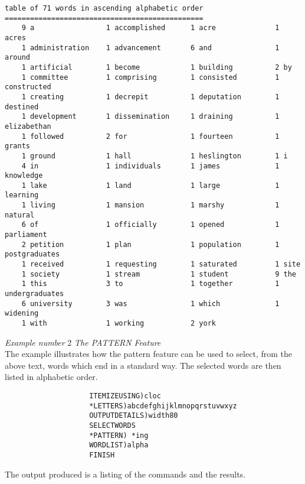 \begin{verbatim}
table of 71 words in ascending alphabetic order
===============================================
    9 a                 1 accomplished      1 acre              1 acres         
    1 administration    1 advancement       6 and               1 around        
    1 artificial        1 become            1 building          2 by            
    1 committee         1 comprising        1 consisted         1 constructed   
    1 creating          1 decrepit          1 deputation        1 destined      
    1 development       1 dissemination     1 draining          1 elizabethan
    1 followed          2 for               1 fourteen          1 grants
    1 ground            1 hall              1 heslington        1 i     
    4 in                1 individuals       1 james             1 knowledge
    1 lake              1 land              1 large             1 learning
    1 living            1 mansion           1 marshy            1 natural    
    6 of                1 officially        1 opened            1 parliament 
    2 petition          1 plan              1 population        1 postgraduates
    1 received          1 requesting        1 saturated         1 site
    1 society           1 stream            1 student           9 the
    1 this              3 to                1 together          1 undergraduates
    6 university        3 was               1 which             1 widening
    1 with              1 working           2 york          
\end{verbatim}

\newpage
 {\em Example number} 2                 {\em The PATTERN Feature}\\
 The example illustrates how the pattern feature can be used to select, from
 the above text, words which end in a standard way. The selected words are
 then listed in alphabetic order.
\begin{verbatim}
                    ITEMIZEUSING)cloc
                    *LETTERS)abcdefghijklmnopqrstuvwxyz
                    OUTPUTDETAILS)width80
                    SELECTWORDS
                    *PATTERN) *ing
                    WORDLIST)alpha
                    FINISH
\end{verbatim}

         The output produced is a listing of the commands and the results.

